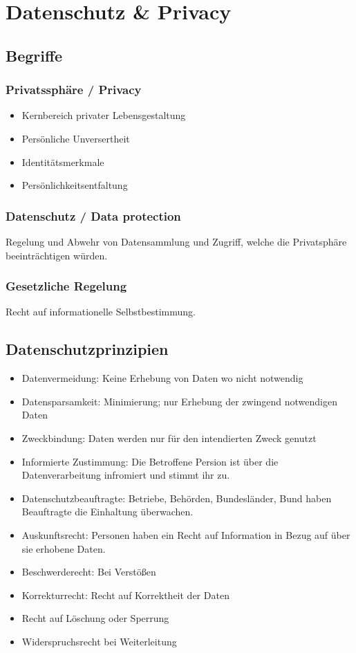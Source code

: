 \chapter{Datenschutz \& Privacy}
\section{Begriffe}
\subsection{Privatssphäre / Privacy}
\begin{itemize}
    \item Kernbereich privater Lebensgestaltung
    \item Persönliche Unversertheit
    \item Identitätsmerkmale
    \item Persönlichkeitsentfaltung
\end{itemize}

\subsection{Datenschutz / Data protection}
Regelung und Abwehr von Datensammlung und Zugriff, welche die Privatsphäre beeinträchtigen würden.

\subsection{Gesetzliche Regelung}
Recht auf informationelle Selbstbestimmung.

\section{Datenschutzprinzipien}
\begin{itemize}
    \item Datenvermeidung: Keine Erhebung von Daten wo nicht notwendig
    \item Datensparsamkeit: Minimierung; nur Erhebung der zwingend notwendigen Daten
    \item Zweckbindung: Daten werden nur für den intendierten Zweck genutzt
    \item Informierte Zustimmung: Die Betroffene Persion ist über die Datenverarbeitung infromiert und stimmt ihr zu.
    \item Datenschutzbeauftragte: Betriebe, Behörden, Bundesländer, Bund haben Beauftragte die Einhaltung überwachen.
    \item Auskunftsrecht: Personen haben ein Recht auf Information in Bezug auf über sie erhobene Daten.
    \item Beschwerderecht: Bei Verstößen
    \item Korrekturrecht: Recht auf Korrektheit der Daten
    \item Recht auf Löschung oder Sperrung
    \item Widerspruchsrecht bei Weiterleitung
\end{itemize}

